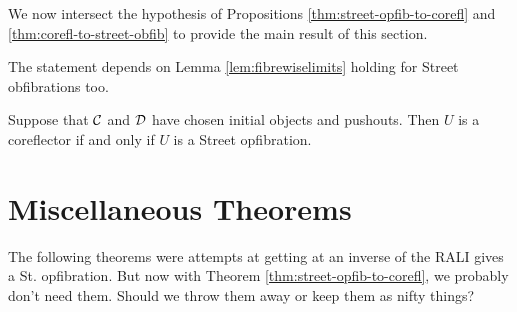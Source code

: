 \documentclass{amsart}
\begin{document}
We now intersect the hypothesis of Propositions
\ref{thm:street-opfib-to-corefl} and
\ref{thm:corefl-to-street-obfib} to provide the
main result of this section.

{\daniel The statement depends on Lemma
  \ref{lem:fibrewiselimits} holding for Street
  obfibrations too.}

\begin{thm}
  \label{thm:main-theorem-street-version}
  Suppose that $ \mathcal{C} $ and $ \mathcal{D} $ have chosen
  initial objects and pushouts. Then $ U $ is a
  coreflector if and only if $ U $ is a Street
  opfibration.  
\end{thm}

\section{Miscellaneous Theorems}




{\daniel The following theorems were attempts at
  getting at an inverse of the RALI gives a
  St. opfibration.  But now with Theorem
  \ref{thm:street-opfib-to-corefl}, we probably
  don't need them.  Should we throw them away or
  keep them as nifty things?}
\end{document}

